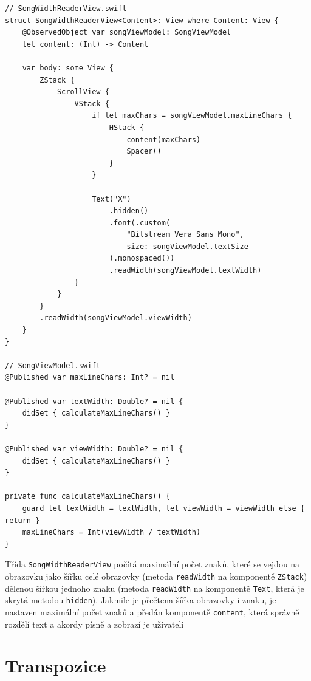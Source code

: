 \begin{listing}
\begin{verbatim}
// SongWidthReaderView.swift
struct SongWidthReaderView<Content>: View where Content: View {
    @ObservedObject var songViewModel: SongViewModel
    let content: (Int) -> Content
    
    var body: some View {
        ZStack {
            ScrollView {
                VStack {
                    if let maxChars = songViewModel.maxLineChars {
                        HStack {
                            content(maxChars)
                            Spacer()
                        }
                    }
                    
                    Text("X")
                        .hidden()
                        .font(.custom(
                            "Bitstream Vera Sans Mono",
                            size: songViewModel.textSize
                        ).monospaced())
                        .readWidth(songViewModel.textWidth)
                }
            }
        }
        .readWidth(songViewModel.viewWidth)
    }
}

// SongViewModel.swift
@Published var maxLineChars: Int? = nil

@Published var textWidth: Double? = nil {
    didSet { calculateMaxLineChars() }
}

@Published var viewWidth: Double? = nil {
    didSet { calculateMaxLineChars() }
}

private func calculateMaxLineChars() {
    guard let textWidth = textWidth, let viewWidth = viewWidth else { return }
    maxLineChars = Int(viewWidth / textWidth)
}
\end{verbatim}
\caption[Ukázka pomocné třídy pro zalamování textu v aplikaci]{Třída \texttt{SongWidthReaderView} počítá maximální počet znaků, které se vejdou na obrazovku jako šířku celé obrazovky (metoda \texttt{readWidth} na komponentě \texttt{ZStack}) dělenou šířkou jednoho znaku (metoda \texttt{readWidth} na komponentě \texttt{Text}, která je skrytá metodou \texttt{hidden}). Jakmile je přečtena šířka obrazovky i znaku, je nastaven maximální počet znaků a předán komponentě \texttt{content}, která správně rozdělí text a akordy písně a zobrazí je uživateli}
\end{listing}

\section{Transpozice}


